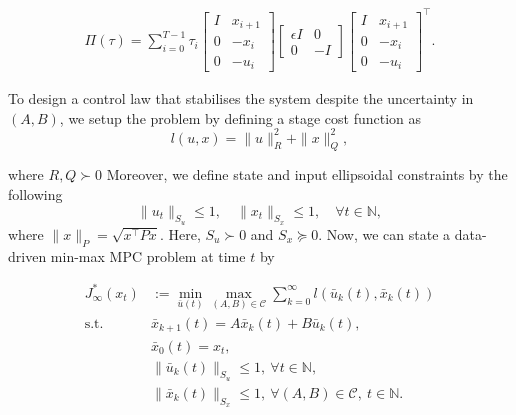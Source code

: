 \begin{align*}
	\label{eq:PI}
	\Pi(\tau) = \sum_{i=0}^{T-1} \tau_i
	\begin{bmatrix}
		I & x_{i+1} \\
		0 & -x_i \\
		0 & -u_i
	\end{bmatrix}
	\begin{bmatrix}
		\epsilon I & 0 \\
		0 & -I
	\end{bmatrix}
	\begin{bmatrix}
		I & x_{i+1} \\
		0 & -x_i \\
		0 & -u_i
	\end{bmatrix}^{\top}.
\end{align*}


To design a control law that stabilises the system despite the uncertainty in \((A, B)\), we setup the problem by defining a stage cost function as
\[
l(u, x) = \|u\|_R^2 + \|x\|_Q^2,
\]


where $R, Q \succ 0$
Moreover, we define state and input ellipsoidal constraints by the following
\[
\|u_t\|_{S_u} \leq 1, \quad \|x_t\|_{S_x} \leq 1, \quad \forall t \in \mathbb{N},
\]
where $\|x\|_P = \sqrt{x^\top P x}.$ Here, $S_u \succ 0$ and $S_x \succeq 0.$
Now, we can state a data-driven min-max MPC problem at time $t$ by

\begin{subequations} \label{eq:main_problem}
	\begin{align*}
		J_\infty^*(x_t) &:= \min_{\bar{u}(t)} \max_{(A, B) \in \mathcal{C}} \sum_{k=0}^{\infty} l\left(\bar{u}_k(t), \bar{x}_k(t)\right) \\
		\text{s.t.} \quad & \bar{x}_{k+1}(t) = A \bar{x}_k(t) + B \bar{u}_k(t), \label{subeq:b}\\
		& \bar{x}_0(t) = x_t, \label{subeq:c}\\
		& \|\bar{u}_k(t)\|_{S_u} \leq 1, \ \forall t \in \mathbb{N}, \label{subeq:d}\\
		& \|\bar{x}_k(t)\|_{S_x} \leq 1, \ \forall \left(A, B\right) \in \mathcal{C}, \ t \in \mathbb{N} \label{subeq:e}.
	\end{align*}
\end{subequations}

